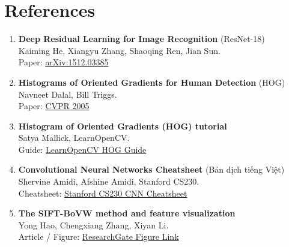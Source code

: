 \documentclass[12pt,a4paper]{article}
\begin{document}
\section{References}
\begin{enumerate}
    \item \textbf{Deep Residual Learning for Image Recognition} (ResNet-18) \\
    Kaiming He, Xiangyu Zhang, Shaoqing Ren, Jian Sun. \\
    Paper: \href{https://arxiv.org/pdf/1512.03385}{arXiv:1512.03385}
    \item \textbf{Histograms of Oriented Gradients for Human Detection} (HOG) \\
    Navneet Dalal, Bill Triggs. \\
    Paper: \href{http://vision.stanford.edu/teaching/cs231b_spring1213/papers/CVPR05_DalalTriggs.pdf}{CVPR 2005}
    \item \textbf{Histogram of Oriented Gradients (HOG) tutorial} \\
    Satya Mallick, LearnOpenCV. \\
    Guide: \href{https://learnopencv.com/histogram-of-oriented-gradients/}{LearnOpenCV HOG Guide}
    \item \textbf{Convolutional Neural Networks Cheatsheet} (Bản dịch tiếng Việt) \\
    Shervine Amidi, Afshine Amidi, Stanford CS230. \\
    Cheatsheet: \href{https://stanford.edu/~shervine/l/vi/teaching/cs-230/cheatsheet-convolutional-neural-networks/}{Stanford CS230 CNN Cheatsheet}
    \item \textbf{The SIFT-BoVW method and feature visualization} \\
    Yong Hao, Chengxiang Zhang, Xiyan Li. \\
    Article / Figure: \href{https://www.researchgate.net/figure/The-SIFT-BoVW-method-and-feature-visualization_fig8_372275637}{ResearchGate Figure Link}
\end{enumerate}
\end{document}
